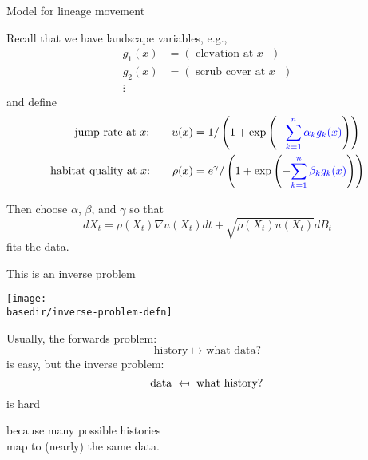 \documentclass{beamer}
\newcommand{\basedir}{files}
\newcommand\mapsfrom{\mathrel{\reflectbox{\ensuremath{\mapsto}}}}
\begin{document}
\begin{frame}{Model for lineage movement}

  Recall that we have {\newthing landscape variables}, e.g.,
  \begin{align*}
    g_1(x) &= ( \text{ elevation at $x$ } ) \\
    g_2(x) &= ( \text{ scrub cover at $x$ } ) \\
    \vdots
  \end{align*}
  and define
  \begin{align*}
    \text{jump rate at $x$:} \qquad u(x) &= 1/\left(1+\exp\left( - {\color{blue} \sum_{k=1}^n \alpha_k g_k(x) } \right) \right) \\
    \text{habitat quality at $x$:} \qquad \rho(x) &= e^\gamma / \left(1+\exp\left( - {\color{blue} \sum_{k=1}^n \beta_k g_k(x) } \right) \right)
  \end{align*}

  Then choose $\alpha$, $\beta$, and $\gamma$ so that
  \[
  dX_t = \rho(X_t) \nabla u(X_t) dt + \sqrt{\rho(X_t) u(X_t)} dB_t  
  \]
  fits the data.

\end{frame}

\begin{frame}{This is an inverse problem}
    \begin{center}
        \texttt{[image: \\basedir/inverse-problem-defn]}

        \vspace{2em}
    \end{center}

\end{frame}

\begin{frame}{}

    {\struct Usually,}
    the {\newthing forwards problem}: 
    \[ \text{ history } \mapsto \text{ what data? } \]
    is easy, but 
    the {\newthing inverse problem}:
    \[ \text{ data } \mapsfrom \text{ what history? } \]
    is {\newthing hard}

    \pause
    \vspace{2em}

    because many possible histories \\
    map to (nearly) the same data.

\end{frame}
\end{document}
